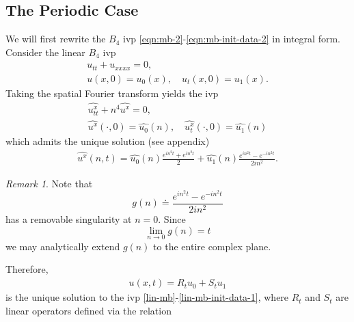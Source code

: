 \documentclass[12pt,reqno]{amsart}
\numberwithin{equation}{section}  %
\numberwithin{figure}{section}
\newcommand{\wh}{\widehat}
\theoremstyle{plain}
\theoremstyle{definition}
\theoremstyle{remark}
\newtheorem{remark}{Remark}
\begin{document}
%
%
%
%
%
%
%
%



%
%
%
%
%
%
%
%
\subsection{The Periodic Case} 
\label{ssec:periodic-case}
We will first rewrite the $B_4$ ivp
\eqref{eqn:mb-2}-\eqref{eqn:mb-init-data-2} in integral form. Consider
the linear $B_4$ ivp
\begin{gather}
  u_{tt} + u_{xxxx} = 0,
  \label{lin-mb}
  \\
  u(x, 0)=u_{0}(x), \quad u_{t}(x,0) = u_{1}(x).
  \label{lin-mb-init-data-1}
\end{gather}
Taking the spatial Fourier transform yields the ivp
\begin{gather*}
  \wh{u_{tt}^{x}} + n^{4} \wh{u^{x}} = 0,
  \\
  \wh{u^{x}}(\cdot, 0) = \wh{u_{0}}(n), \quad
  \wh{u_{t}^{x}}(\cdot, 0) = \wh{u_{1}}(n)
\end{gather*}
which admits the unique solution (see appendix)
%
%
\begin{equation*}
  \begin{split}
    \wh{u^{x}}(n, t) = \wh{u_{0}}(n) \frac{e^{in^{2}t} + e^{in^{2}t}}{2} + 
    \wh{u_{1}}(n) \frac{e^{in^{2}t} - e^{-in^{2}t}}{2i n^{2}}.
  \end{split}
\end{equation*}
%
%
%
%
\begin{framed}
\begin{remark}
  Note that $$g(n) \doteq \frac{e^{in^{2}t} - e^{-in^{2}t}}{2i n^{2}}$$ has a removable
  singularity at $n=0$. Since $$\lim_{n \to 0} g(n) = t$$ we may analytically
  extend $g(n)$ to the entire complex plane. 
\label{rem:analytic-extension}
\end{remark}
\end{framed}
%
%
%
Therefore,
%
%
\begin{equation*}
  \begin{split}
    u(x,t) = R_t u_{0} + S_{t}u_{1}
  \end{split}
\end{equation*}
%
is the unique solution to the ivp
\eqref{lin-mb}-\eqref{lin-mb-init-data-1}, where $R_{t}$ and $S_{t}$ are linear operators defined via the relation
\end{document}
